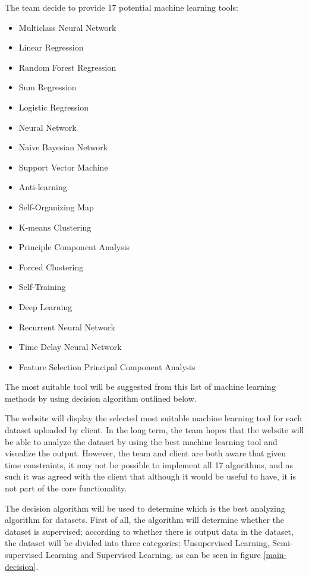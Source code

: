 \documentclass[a4paper,titlepage]{article}
\begin{document}
The team decide to provide 17 potential machine learning tools:
\begin{multicols}{2}
\begin{itemize}
  \item Multiclass Neural Network
  \item Linear Regression
  \item Random Forest Regression
  \item Sum Regression
  \item Logistic Regression
  \item Neural Network
  \item Naive Bayesian Network
  \item Support Vector Machine
  \item Anti-learning
  \item Self-Organizing Map
  \item K-means Clustering
  \item Principle Component Analysis
  \item Forced Clustering
  \item Self-Training
  \item Deep Learning
  \item Recurrent Neural Network
  \item Time Delay Neural Network
  \item Feature Selection Principal Component Analysis
\end{itemize}
\end{multicols}

The most suitable tool will be suggested from this list of machine learning methods by using decision algorithm outlined below.

The website will display the selected most suitable machine learning tool for each dataset uploaded by client. 
In the long term, the team hopes that the website will be able to analyze the dataset by using the best machine learning tool and visualize the output. 
However, the team and client are both aware that given time constraints, it may not be possible to implement all 17 algorithms, and as such it was agreed with the client that although it would be useful to have, it is not part of the core functionality.

The decision algorithm will be used to determine which is the best analyzing algorithm for datasets. 
First of all, the algorithm will determine whether the dataset is supervised; according to whether there is output data in the dataset, the dataset will be divided into three categories: Unsupervised Learning, Semi-supervised Learning and Supervised Learning, as can be seen in figure \ref{main-decision}.
\end{document}
